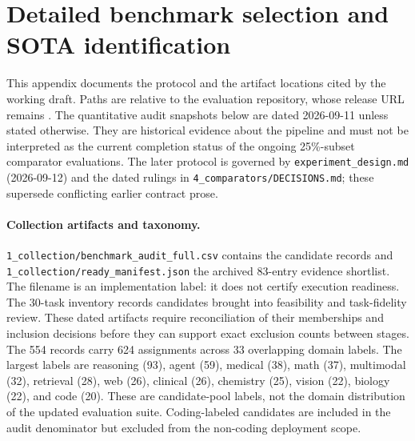 \section{Detailed benchmark selection and SOTA identification}
\label{app:collection}

This appendix documents the protocol and the artifact locations cited by the working draft.
Paths are relative to the evaluation repository, whose release URL remains .
The quantitative audit snapshots below are dated 2026-09-11 unless stated otherwise. They
are historical evidence about the pipeline and must not be interpreted as the current completion
status of the ongoing 25\%-subset comparator evaluations. The later protocol is governed by
\texttt{experiment\_design.md} (2026-09-12) and the dated rulings in
\texttt{4\_comparators/DECISIONS.md}; these supersede conflicting earlier contract prose.

\paragraph{Collection artifacts and taxonomy.}
\texttt{1\_collection/benchmark\_audit\_full.csv} contains the candidate records and
\texttt{1\_collection/ready\_manifest.json} the archived 83-entry evidence shortlist. The filename
is an implementation label: it does not certify execution readiness. The 30-task inventory
records candidates brought into feasibility and task-fidelity review. These dated artifacts
require reconciliation of their memberships and inclusion decisions before they can support
exact exclusion counts between stages. The 554 records carry
624 assignments across 33 overlapping domain labels. The largest labels are reasoning (93),
agent (59), medical (38), math (37), multimodal (32), retrieval (28), web (26), clinical (26),
chemistry (25), vision (22), biology (22), and code (20). These are candidate-pool labels, not the
domain distribution of the updated evaluation suite. Coding-labeled candidates are included
in the audit denominator but excluded from the non-coding deployment scope.

